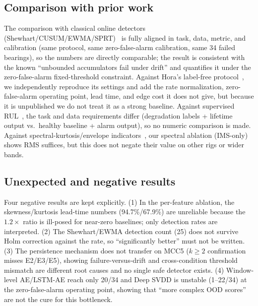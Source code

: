 \documentclass[journal]{IEEEtran}
\begin{document}
\subsection{Comparison with prior work}
The comparison with classical online detectors (Shewhart/CUSUM/EWMA/SPRT)~\cite{shewhart1931,page1954,roberts1959,wald1945,truong2020} is fully aligned in task, data, metric, and calibration (same protocol, same zero-false-alarm calibration, same 34 failed bearings), so the numbers are directly comparable; the result is consistent with the known ``unbounded accumulators fail under drift'' and quantifies it under the zero-false-alarm fixed-threshold constraint. Against Hora's label-free protocol~\cite{hora_submitted,hora_unpublished}, we independently reproduce its settings and add the rate normalization, zero-false-alarm operating point, lead time, and edge cost it does not give, but because it is unpublished we do not treat it as a strong baseline. Against supervised RUL~\cite{wang2020,gebraeel2004,li2018cnn,qiao2026}, the task and data requirements differ (degradation labels + lifetime output vs.\ healthy baseline + alarm output), so no numeric comparison is made. Against spectral-kurtosis/envelope indicators~\cite{antoni2006,randall2011,smith2015}, our spectral ablation (IMS-only) shows RMS suffices, but this does not negate their value on other rigs or wider bands.

\subsection{Unexpected and negative results}
Four negative results are kept explicitly. (1) In the per-feature ablation, the skewness/kurtosis lead-time numbers (94.7\%/67.9\%) are unreliable because the $1.2\times$ ratio is ill-posed for near-zero baselines; only detection rates are interpreted. (2) The Shewhart/EWMA detection count (25) does not survive Holm correction against the rate, so ``significantly better'' must not be written. (3) The persistence mechanism does not transfer on MCC5 ($k\ge2$ confirmation misses E2/E3/E5), showing failure-versus-drift and cross-condition threshold mismatch are different root causes and no single safe detector exists. (4) Window-level AE/LSTM-AE reach only 20/34 and Deep SVDD is unstable (1--22/34) at the zero-false-alarm operating point, showing that ``more complex OOD scores'' are not the cure for this bottleneck.
\end{document}
